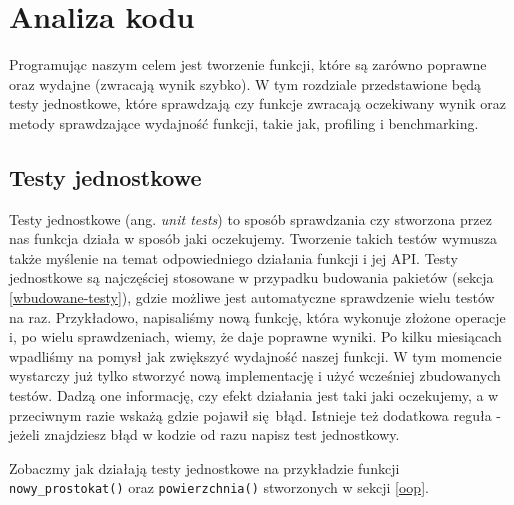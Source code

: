 \documentclass[paper=6in:9in,pagesize=pdftex,headinclude=on,footinclude=on,10pt]{scrbook}
\begin{document}
\hypertarget{analiza-kodu}{%
\chapter{Analiza kodu}\label{analiza-kodu}}

Programując naszym celem jest tworzenie funkcji, które są zarówno poprawne oraz wydajne (zwracają wynik szybko).
W tym rozdziale przedstawione będą testy jednostkowe, które sprawdzają czy funkcje zwracają oczekiwany wynik oraz metody sprawdzające wydajność funkcji, takie jak, profiling i benchmarking.

\hypertarget{testy-jednostkowe}{%
\section{Testy jednostkowe}\label{testy-jednostkowe}}

Testy jednostkowe (ang. \emph{unit tests}) to sposób sprawdzania czy stworzona przez nas funkcja działa w sposób jaki oczekujemy.
Tworzenie takich testów wymusza także myślenie na temat odpowiedniego działania funkcji i jej API.
Testy jednostkowe są najczęściej stosowane w przypadku budowania pakietów (sekcja \ref{wbudowane-testy}), gdzie możliwe jest automatyczne sprawdzenie wielu testów na raz.
Przykładowo, napisaliśmy nową funkcję, która wykonuje złożone operacje i, po wielu sprawdzeniach, wiemy, że daje poprawne wyniki.
Po kilku miesiącach wpadliśmy na pomysł jak zwiększyć wydajność naszej funkcji.
W tym momencie wystarczy już tylko stworzyć nową implementację i użyć wcześniej zbudowanych testów.
Dadzą one informację, czy efekt działania jest taki jaki oczekujemy, a w przeciwnym razie wskażą gdzie pojawił się~błąd.
Istnieje też dodatkowa reguła - jeżeli znajdziesz błąd w kodzie od razu napisz test jednostkowy.

Zobaczmy jak działają testy jednostkowe na przykładzie funkcji \texttt{nowy\_prostokat()} oraz \texttt{powierzchnia()} stworzonych w sekcji \ref{oop}.
\end{document}
